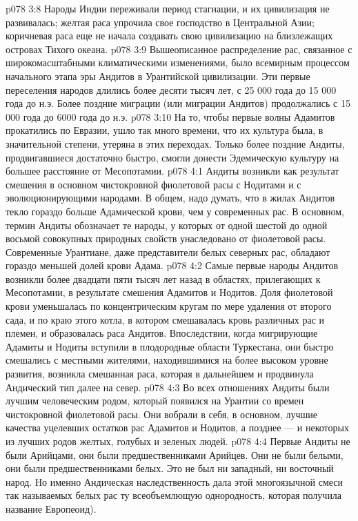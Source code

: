 \vs p078 3:8 Народы Индии переживали период стагнации, и их цивилизация не развивалась; желтая раса упрочила свое господство в Центральной Азии; коричневая раса еще не начала создавать свою цивилизацию на близлежащих островах Тихого океана.
\vs p078 3:9 \pc Вышеописанное распределение рас, связанное с широкомасштабными климатическими изменениями, было всемирным процессом начального этапа эры Андитов в Урантийской цивилизации. Эти первые переселения народов длились более десяти тысяч лет, с 25 000 года до 15 000 года до н.э. Более поздние миграции (или миграции Андитов) продолжались с 15 000 года до 6000 года до н.э.
\vs p078 3:10 На то, чтобы первые волны Адамитов прокатились по Евразии, ушло так много времени, что их культура была, в значительной степени, утеряна в этих переходах. Только более поздние Андиты, продвигавшиеся достаточно быстро, смогли донести Эдемическую культуру на большее расстояние от Месопотамии.
\vs p078 4:1 Андиты возникли как результат смешения в основном чистокровной фиолетовой расы с Нодитами и с эволюционирующими народами. В общем, надо думать, что в жилах Андитов текло гораздо больше Адамической крови, чем у современных рас. В основном, термин Андиты обозначает те народы, у которых от одной шестой до одной восьмой совокупных природных свойств унаследовано от фиолетовой расы. Современные Урантиане, даже представители белых северных рас, обладают гораздо меньшей долей крови Адама.
\vs p078 4:2 Самые первые народы Андитов возникли более двадцати пяти тысяч лет назад в областях, прилегающих к Месопотамии, в результате смешения Адамитов и Нодитов. Доля фиолетовой крови уменьшалась по концентрическим кругам по мере удаления от второго сада, и по краю этого котла, в котором смешавалась кровь различных рас и племен, и образовалась раса Андитов. Впоследствии, когда мигрирующие Адамиты и Нодиты вступили в плодородные области Туркестана, они быстро смешались с местными жителями, находившимися на более высоком уровне развития, возникла смешанная раса, которая в дальнейшем и продвинула Андический тип далее на север.
\vs p078 4:3 Во всех отношениях Андиты были лучшим человеческим родом, который появился на Урантии со времен чистокровной фиолетовой расы. Они вобрали в себя, в основном, лучшие качества уцелевших остатков рас Адамитов и Нодитов, а позднее --- и некоторых из лучших родов желтых, голубых и зеленых людей.
\vs p078 4:4 \pc Первые Андиты не были Арийцами, они были предшественниками Арийцев. Они не были белыми, они были предшественниками белых. Это не был ни западный, ни восточный народ. Но именно Андическая наследственность дала этой многоязычной смеси так называемых белых рас ту всеобъемлющую однородность, которая получила название Европеоид).
